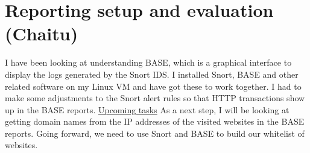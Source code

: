 \documentclass[12pt] {article}
\begin{document}
\section*{Reporting setup and evaluation {\normalsize (Chaitu)}}
I have been looking at understanding BASE, which is a graphical interface to display the logs generated by the Snort IDS. I installed Snort, BASE and other related software on my Linux VM and have got these to work together. I had to make some adjustments to the Snort alert rules so that HTTP transactions show up in the BASE reports.
\newline
\newline
\underline{Upcoming tasks}
\newline
As a next step, I will be looking at getting domain names from the IP addresses of the visited websites in the BASE reports. Going forward, we need to use Snort and BASE to build our whitelist of websites.
\end{document}
